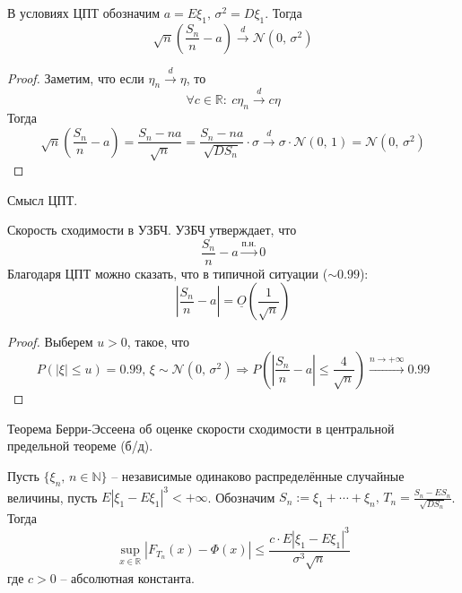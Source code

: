 \begin{corollary}
	В условиях ЦПТ обозначим $a = E\xi_1,\, \sigma^2 = D\xi_1$. Тогда
	\[\sqrt{n}\left(\frac{S_n}{n} - a\right) \stackrel{d}{\to} \mathcal{N}(0,\, \sigma^2)\]
\end{corollary}

\begin{proof}
	Заметим, что если $\eta_n \stackrel{d}{\to} \eta$, то
	\[\forall c \in \mathbb{R}:\: c\eta_n \stackrel{d}{\to} c\eta\]
	Тогда
	\[\sqrt{n}\left(\frac{S_n}{n} - a\right) = \frac{S_n - na}{\sqrt{n}} = \frac{S_n - na}{\sqrt{DS_n}}\cdot\sigma \stackrel{d}{\to} \sigma\cdot\mathcal{N}(0,\,1) = \mathcal{N}(0,\,\sigma^2)\]
\end{proof}

\begin{note}
	Смысл ЦПТ.

	Скорость сходимости в УЗБЧ. УЗБЧ утверждает, что
	\[\frac{S_n}{n} - a \stackrel{\text{п.н.}}{\to} 0\]
	Благодаря ЦПТ можно сказать, что в типичной ситуации ($\sim 0.99$):
	\[\left|\frac{S_n}{n} - a\right| = \underline{O}\left(\frac{1}{\sqrt{n}}\right)\]

\end{note}

\begin{proof}
	Выберем $u > 0$, такое, что
	\[P(|\xi| \leq u) = 0.99,\, \xi \sim \mathcal{N}(0,\,\sigma^2) \Rightarrow P\left(\left|\frac{S_n}{n} - a\right| \leq \frac{4}{\sqrt{n}}\right) \stackrel{n \to +\infty}{\to} 0.99\]
\end{proof}

\begin{theorem}
	Теорема Берри-Эссеена об оценке скорости сходимости в центральной предельной теореме (б/д).

	Пусть $\{\xi_n,\, n \in \mathbb{N}\}$ -- независимые одинаково распределённые случайные величины, пусть $E|\xi_1 - E\xi_1|^3 < +\infty$. Обозначим $S_n := \xi_1 + \cdots + \xi_n,\, T_n = \frac{S_n - ES_n}{\sqrt{DS_n}}$. Тогда
	\[\sup_{x \in \mathbb{R}}|F_{T_n}(x) - \Phi(x)| \leq \frac{c \cdot E|\xi_1 - E\xi_1|^3}{\sigma^3\sqrt{n}}\]
	где $c > 0$ -- абсолютная константа.
\end{theorem}
